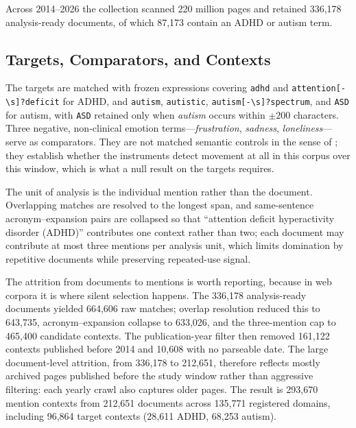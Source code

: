 \documentclass[final]{clv2025}
\begin{document}
Across 2014--2026 the collection scanned 220 million pages and retained 336{,}178
analysis-ready documents, of which 87{,}173 contain an ADHD or autism term.

\subsection{Targets, Comparators, and Contexts}

\newcommand{\pat}[1]{\texttt{#1}\allowbreak}
The targets are matched with frozen expressions covering \pat{adhd} and
\pat{attention[-\textbackslash s]?}\pat{deficit} for ADHD, and \pat{autism},
\pat{autistic}, \pat{autism[-\textbackslash s]?}\pat{spectrum}, and \pat{ASD} for
autism, with \texttt{ASD} retained only when \emph{autism} occurs within $\pm200$
characters. Three negative, non-clinical emotion terms---\emph{frustration},
\emph{sadness}, \emph{loneliness}---serve as comparators. They are not matched semantic
controls in the sense of \citet{dubossarsky-etal-2017-outta}; they establish whether the
instruments detect movement at all in this corpus over this window, which is what a null
result on the targets requires.

The unit of analysis is the individual mention rather than the document. Overlapping
matches are resolved to the longest span, and same-sentence acronym--expansion pairs are
collapsed so that ``attention deficit hyperactivity disorder (ADHD)'' contributes one
context rather than two; each document may contribute at most three mentions per analysis
unit, which limits domination by repetitive documents while preserving repeated-use signal.

The attrition from documents to mentions is worth reporting, because in web corpora it is
where silent selection happens. The 336{,}178 analysis-ready documents yielded 664{,}606
raw matches; overlap resolution reduced this to 643{,}735, acronym--expansion collapse to
633{,}026, and the three-mention cap to 465{,}400 candidate contexts. The publication-year
filter then removed 161{,}122 contexts published before 2014 and 10{,}608 with no parseable
date. The large document-level attrition, from 336{,}178 to 212{,}651, therefore reflects
mostly archived pages published before the study window rather than aggressive filtering:
each yearly crawl also captures older pages. The result is 293{,}670 mention contexts from
212{,}651 documents across 135{,}771 registered domains, including 96{,}864 target contexts
(28{,}611 ADHD, 68{,}253 autism).
\end{document}
